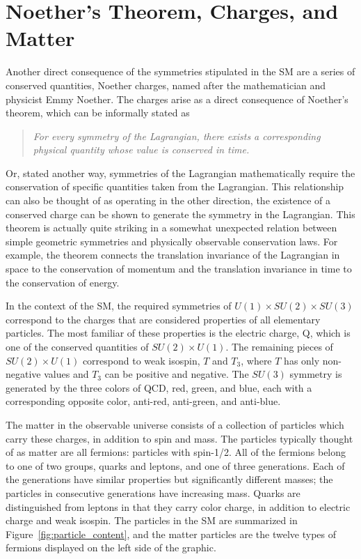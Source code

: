 \section{Noether's Theorem, Charges, and Matter}

Another direct consequence of the symmetries stipulated in the \ac{SM} are a series of conserved quantities, Noether charges, named after the mathematician and physicist Emmy Noether.
The charges arise as a direct consequence of Noether's theorem, which can be informally stated as 
\begin{quote}
\textit{For every symmetry of the Lagrangian, there exists a corresponding physical quantity whose value is conserved in time.}
\end{quote}
\noindent Or, stated another way, symmetries of the Lagrangian mathematically require the conservation of specific quantities taken from the Lagrangian. 
This relationship can also be thought of as operating in the other direction, the existence of a conserved charge can be shown to generate the symmetry in the Lagrangian.
This theorem is actually quite striking in a somewhat unexpected relation between simple geometric symmetries and physically observable conservation laws. 
For example, the theorem connects the translation invariance of the Lagrangian in space to the conservation of momentum and the translation invariance in time to the conservation of energy. 

In the context of the \ac{SM}, the required symmetries of $U(1)\times SU(2) \times SU(3)$ correspond to the charges that are considered properties of all elementary particles.
The most familiar of these properties is the electric charge, Q, which is one of the conserved quantities of $SU(2)\times U(1)$.
The remaining pieces of $SU(2)\times U(1)$ correspond to weak isospin, $T$ and $T_3$, where $T$ has only non-negative values and $T_3$ can be positive and negative.
The $SU(3)$ symmetry is generated by the three colors of \ac{QCD}, red, green, and blue, each with a corresponding opposite color, anti-red, anti-green, and anti-blue.

The matter in the observable universe consists of a collection of particles which carry these charges, in addition to spin and mass.
The particles typically thought of as matter are all fermions: particles with spin-1/2.
All of the fermions belong to one of two groups, quarks and leptons, and one of three generations.
Each of the generations have similar properties but significantly different masses; the particles in consecutive generations have increasing mass.
Quarks are distinguished from leptons in that they carry color charge, in addition to  electric charge and weak isospin.
The particles in the \ac{SM} are summarized in Figure~\ref{fig:particle_content}, and the matter particles are the twelve types of fermions displayed on the left side of the graphic.

